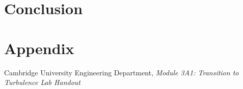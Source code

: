 \documentclass{article}
\begin{document}

\section{Conclusion}



\section{Appendix}

\begin{thebibliography}{9}
    Cambridge University Engineering Department, \textit{Module 3A1: Transition to Turbulence Lab Handout}
\end{thebibliography}
\end{document}
